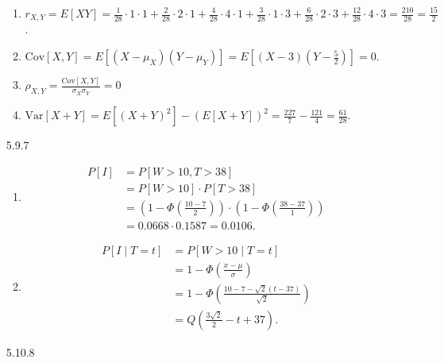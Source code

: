 \documentclass{article}
\begin{document}
\begin{enumerate}
\begin{enumerate}[label=(\alph*)]
        \item
        $r_{X, Y} = E[XY] = \frac{1}{28}  \cdot 1 \cdot 1                  
                          + \frac{2}{28}  \cdot 2 \cdot 1
                          + \frac{4}{28}  \cdot 4 \cdot 1
                          + \frac{3}{28}  \cdot 1 \cdot 3
                          + \frac{6}{28}  \cdot 2 \cdot 3
                          + \frac{12}{28} \cdot 4 \cdot 3 = \frac{210}{28} = \frac{15}{2}$.

        \item
        $\text{Cov}[X, Y] = E[(X - \mu_X)(Y - \mu_Y)] = E[(X - 3)(Y - \frac{5}{2})] = 0.$

        \item
        $\rho_{X, Y} = \frac{\text{Cov}[X, Y]}{\sigma_X \sigma_Y} = 0$

        \item
        $\text{Var}[X + Y] = E[(X + Y)^2] - (E[X + Y])^2 = \frac{227}{7} - \frac{121}{4} = \frac{61}{28}$.
    \end{enumerate}

    \item [5.9.7]

    \begin{enumerate}[label=(\alph*)]
        \item 
        \begin{align*}
            P[I] & = P[W > 10, T > 38] \\
                 & = P[W > 10] \cdot P[T > 38] \\
                 & = (1 - \Phi(\frac{10 - 7}{2})) \cdot (1 - \Phi(\frac{38 - 37}{1})) \\
                 & = 0.0668 \cdot 0.1587 = 0.0106.
        \end{align*}

        \item

        \begin{align*}
            P[I \mid T = t] & = P[W > 10 \mid T = t] \\
                & = 1 - \Phi(\frac{x - \mu}{\sigma}) \\
                & = 1 - \Phi(\frac{10 - 7 - \sqrt 2 (t - 37)}{\sqrt 2}) \\
                & = Q(\frac{3\sqrt 2}{2} - t + 37).
        \end{align*}
    \end{enumerate}

    \item [5.10.8]


\end{enumerate}
\end{document}
